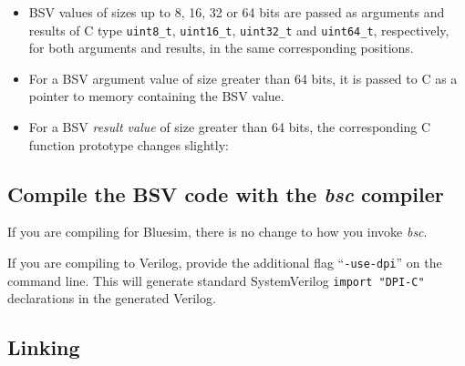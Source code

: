\begin{itemize}

 \item BSV values of sizes up to 8, 16, 32 or 64 bits are passed as
       arguments and results of C type \verb|uint8_t|,
       \verb|uint16_t|, \verb|uint32_t| and \verb|uint64_t|,
       respectively, for both arguments and results, in the same
       corresponding positions.

 \item For a BSV argument value of size greater than 64 bits, it is
       passed to C as a pointer to memory containing the BSV value.

 \item For a BSV \emph{result value} of size greater than 64 bits, the
       corresponding C function prototype changes slightly:

\end{itemize}


\subsection{Compile the BSV code with the \emph{bsc} compiler}

If you are compiling for Bluesim, there is no change to how you invoke
\emph{bsc}.

If you are compiling to Verilog, provide the additional flag
``\verb|-use-dpi|'' on the command line.  This will generate standard
SystemVerilog \verb|import "DPI-C"| declarations in the generated
Verilog.


\subsection{Linking}

